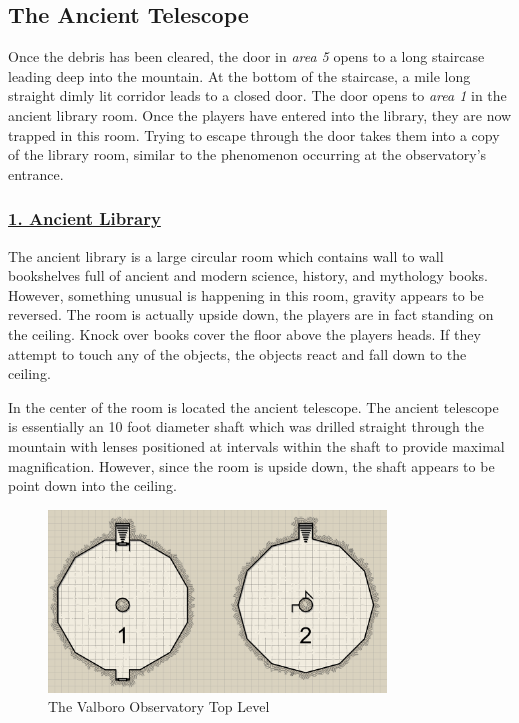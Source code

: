 \documentclass{article}
\begin{document}
\begin{multicols*}{2}
	\section{The Ancient Telescope}
	Once the debris has been cleared, the door in \emph{area 5} opens to a long staircase leading deep into the mountain. At the bottom of the staircase, a mile long straight dimly lit corridor leads to a closed door. The door opens to \emph{area 1} in the ancient library room. Once the players have entered into the library, they are now trapped in this room. Trying to escape through the door takes them into a copy of the library room, similar to the phenomenon occurring at the observatory's entrance.
	
	\subsubsection*{\underline{1. Ancient Library}}
	The ancient library is a large circular room which contains wall to wall bookshelves full of ancient and modern science, history, and mythology books. However, something unusual is happening in this room, gravity appears to be reversed. The room is actually upside down, the players are in fact standing on the ceiling. Knock over books cover the floor above the players heads. If they attempt to touch any of the objects, the objects react and fall down to the ceiling.
	
	In the center of the room is located the ancient telescope. The ancient telescope is essentially an 10 foot diameter shaft which was drilled straight through the mountain with lenses positioned at intervals within the shaft to provide maximal magnification. However, since the room is upside down, the shaft appears to be point down into the ceiling.  
	
	\begin{figure}
		\centering
		\includegraphics[width=0.8\textwidth]{images/ancient_telescope}
		\caption{The Valboro Observatory Top Level}
	\end{figure}
	
\end{multicols*}
	
\end{document}

